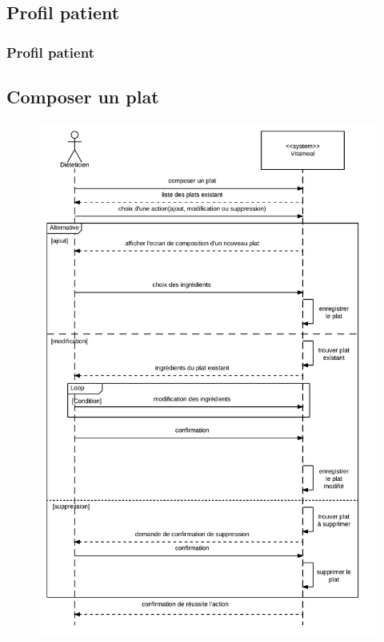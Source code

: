 \documentclass{beamer}
\begin{document}
\subsection{Profil patient}
\begin{frame}
\frametitle{Profil patient}

\end{frame}

\subsection{Composer un plat}

\begin{frame}[plain]{}
\begin{figure}
\centering
\includegraphics[scale=0.125]{../CasDUtilisations/CompositionPlat/sequence_UC_ComposerPlat.png}
\end{figure}
\end{frame}
\end{document}
